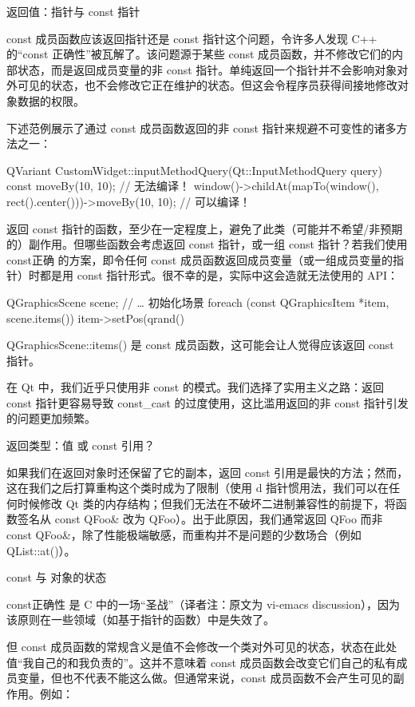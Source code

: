 返回值：指针与 const 指针

const 成员函数应该返回指针还是 const 指针这个问题，令许多人发现 C++ 的“const 正确性”被瓦解了。该问题源于某些 const 成员函数，并不修改它们的内部状态，而是返回成员变量的非 const 指针。单纯返回一个指针并不会影响对象对外可见的状态，也不会修改它正在维护的状态。但这会令程序员获得间接地修改对象数据的权限。

下述范例展示了通过 const 成员函数返回的非 const 指针来规避不可变性的诸多方法之一：

\begin{cppcode}
QVariant CustomWidget::inputMethodQuery(Qt::InputMethodQuery query) const {
	moveBy(10, 10); // 无法编译！
	window()->childAt(mapTo(window(), rect().center()))->moveBy(10, 10); // 可以编译！
}
\end{cppcode}

返回 const 指针的函数，至少在一定程度上，避免了此类（可能并不希望/非预期的）副作用。但哪些函数会考虑返回 const 指针，或一组 const 指针？若我们使用 const正确 的方案，即令任何 const 成员函数返回成员变量（或一组成员变量的指针）时都是用 const 指针形式。很不幸的是，实际中这会造就无法使用的 API：

\begin{cppcode}
QGraphicsScene scene;
// … 初始化场景
foreach (const QGraphicsItem *item, scene.items()) {
	item->setPos(qrand() %
}
\end{cppcode}

QGraphicsScene::items() 是 const 成员函数，这可能会让人觉得应该返回 const 指针。

在 Qt 中，我们近乎只使用非 const 的模式。我们选择了实用主义之路：返回 const 指针更容易导致 const\_cast 的过度使用，这比滥用返回的非 const 指针引发的问题更加频繁。

返回类型：值 或 const 引用？

如果我们在返回对象时还保留了它的副本，返回 const 引用是最快的方法；然而，这在我们之后打算重构这个类时成为了限制（使用 d 指针惯用法，我们可以在任何时候修改 Qt 类的内存结构；但我们无法在不破坏二进制兼容性的前提下，将函数签名从 const QFoo\& 改为 QFoo）。出于此原因，我们通常返回 QFoo 而非 const QFoo\&，除了性能极端敏感，而重构并不是问题的少数场合（例如 QList::at()）。

const 与 对象的状态

const正确性 是 C 中的一场“圣战”（译者注：原文为 vi-emacs discussion），因为该原则在一些领域（如基于指针的函数）中是失效了。

但 const 成员函数的常规含义是值不会修改一个类对外可见的状态，状态在此处值“我自己的和我负责的”。这并不意味着 const 成员函数会改变它们自己的私有成员变量，但也不代表不能这么做。但通常来说，const 成员函数不会产生可见的副作用。例如：

